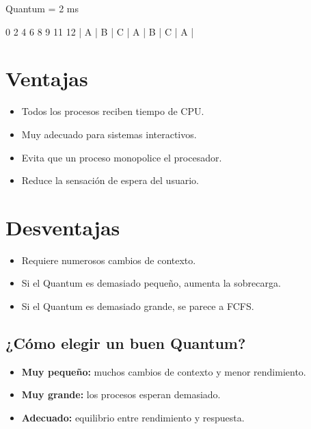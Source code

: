 \documentclass[
  spanish,
  letterpaper,
]{scrbook}
\newenvironment{Shaded}{\begin{snugshade}}{\end{snugshade}}
\newcommand{\NormalTok}[1]{\textcolor[rgb]{0.00,0.23,0.31}{#1}}
\providecommand{\tightlist}{%
  \setlength{\itemsep}{0pt}\setlength{\parskip}{0pt}}
\begin{document}
\begin{Shaded}
\begin{Highlighting}[]
\NormalTok{Quantum = 2 ms}

\NormalTok{0   2   4   6   8   9  11 12}
\NormalTok{| A | B | C | A | B | C | A |}
\end{Highlighting}
\end{Shaded}


\chapter{Ventajas}\label{ventajas-6}

\begin{itemize}
\tightlist
\item
  Todos los procesos reciben tiempo de CPU.
\item
  Muy adecuado para sistemas interactivos.
\item
  Evita que un proceso monopolice el procesador.
\item
  Reduce la sensación de espera del usuario.
\end{itemize}


\chapter{Desventajas}\label{desventajas-3}

\begin{itemize}
\tightlist
\item
  Requiere numerosos cambios de contexto.
\item
  Si el Quantum es demasiado pequeño, aumenta la sobrecarga.
\item
  Si el Quantum es demasiado grande, se parece a FCFS.
\end{itemize}

\section{¿Cómo elegir un buen
Quantum?}\label{cuxf3mo-elegir-un-buen-quantum}

\begin{itemize}
\tightlist
\item
  \textbf{Muy pequeño:} muchos cambios de contexto y menor rendimiento.
\item
  \textbf{Muy grande:} los procesos esperan demasiado.
\item
  \textbf{Adecuado:} equilibrio entre rendimiento y respuesta.
\end{itemize}
\end{document}
